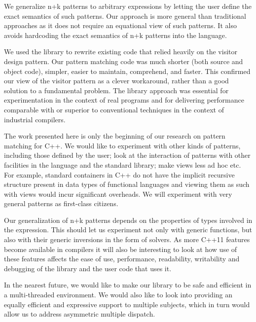 \documentclass{llncs}
\begin{document}
We generalize n+k patterns to arbitrary expressions by letting the user define 
the exact semantics of such patterns. Our approach is more general than traditional approaches 
as it does not require an
equational view of such patterns. It also avoids hardcoding the 
exact semantics of n+k patterns into the language. 

We used the library to rewrite existing code that relied heavily on the 
visitor design pattern.
Our pattern matching code was much shorter (both source and object code), 
simpler, easier to maintain, comprehend, and faster. 
This confirmed our view of the visitor pattern as a clever workaround,
rather than a good solution to a fundamental problem.
The library approach was essential 
for experimentation in the context of real programs and for delivering 
performance comparable with or superior to conventional techniques in the 
context of industrial compilers.

The work presented here is only the beginning of our research on pattern 
matching for C++. We would like to experiment with other kinds of patterns, 
including those defined by the user; look at the interaction of patterns with 
other facilities in the language and the standard library; make
views less ad hoc etc. For example, standard containers in C++ do not have the 
implicit recursive structure present in data types of functional languages and 
viewing them as such with views would incur significant overheads. We will
experiment with very general patterns as first-class citizens.

Our generalization of n+k patterns depends on the properties of types involved 
in the expression. This should let us experiment not only with generic 
functions, but also with their generic inversions in the form of solvers. As 
more C++11 features become available in compilers it will also be interesting to 
look at how use of these features affects the ease of use, performance, 
readability, writability and debugging of the library and the user code that 
uses it.

In the nearest future, we would like to make our library to be safe and efficient 
in a multi-threaded environment. We would also like to look into providing an 
equally efficient and expressive support to multiple subjects, which in turn 
would allow us to address asymmetric multiple dispatch.



\end{document}
